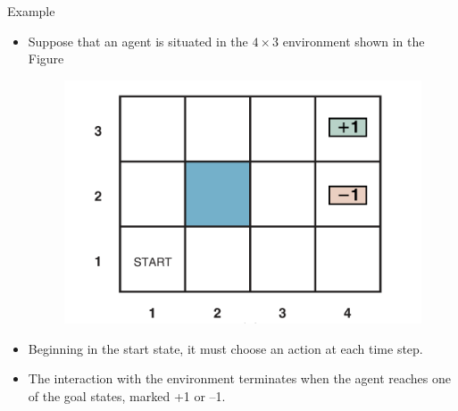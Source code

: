 \documentclass[handout]{beamer}
\begin{document}
\begin{frame}{Example}
\scriptsize{
\begin{itemize}
\item Suppose that an agent is situated in the $4\times 3$ environment shown in the Figure 


  \begin{figure}[h]
        	\includegraphics[scale = 0.4]{pics/example.png}
        \end{figure}

\item Beginning in the start state, it must choose an action at each time step. 

\item The interaction with the environment terminates when the agent reaches one of the goal states, marked +1 or –1.

\end{itemize}


} 

\end{frame}
\end{document}

